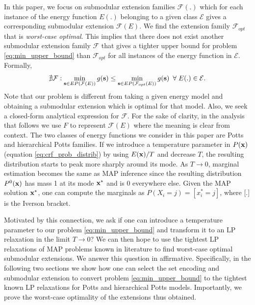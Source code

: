 In this paper, we focus on submodular extension families $\mathcal F(.)$ which
for each instance of the energy function $E(.)$ belonging to a given class $\mathcal E$ gives a corresponding
submodular extension ${\mathcal F}(E)$. We find the extension family ${\mathcal
F}_{opt}$ that is \emph{worst-case optimal}. This implies that there does not
exist another submodular extension family ${\mathcal F}$ that gives a tighter
upper bound for problem \eqref{eq:min_upper_bound} than ${\mathcal F}_{opt}$
for all instances of the energy function in $\mathcal E$. Formally, 
\begin{equation}
    \nexists {\mathcal F}: \min_{{\bf s} \in EP({\mathcal F}(E))} g({\bf s})
    \leq \min_{{\bf s} \in EP({\mathcal F}_{opt}(E))} g({\bf s}) \enspace
    \forall \; E(.) \in \mathcal E.
    \label{eq:best_submod}
\end{equation}
Note that our problem is different from taking a given energy model and
obtaining a submodular extension which is optimal for that model. Also, we seek
a closed-form analytical expression for $\mathcal F$. For the sake of clarity,
in the analysis that follows we use $F$ to represent ${\mathcal F}(E)$ where
the meaning is clear from context. The two classes of energy functions we
consider in this paper are Potts and hierarchical Potts families.
%
 If we introduce a temperature parameter in $P({\bf x})$ (equation \eqref{eq:crf_prob_distrib}) by using $E({\bf x})/T$ and decrease $T$, the resulting distribution starts to peak more sharply around its mode. As $T \to 0$, marginal estimation becomes the same as MAP inference since the resulting distribution $P^0({\bf x})$ has mass 1 at its mode ${\bf x}^*$ and is 0 everywhere else. Given the MAP solution ${\bf x}^*$, one can compute the marginals as $P(X_i = j) = [x_i^* = j]$, where [.] is the Iverson bracket.

Motivated by this connection, we ask if one can introduce a temperature parameter to our problem \eqref{eq:min_upper_bound} and transform it to an LP relaxation in the limit $T \to 0$? We can then hope to use the tightest LP relaxations of MAP problems known in literature to find worst-case optimal submodular extensions. We answer this question in affirmative. Specifically, in the following two sections we show how one can select the set encoding and submodular extension to convert problem \eqref{eq:min_upper_bound} to the tightest known LP relaxations for Potts and hierarchical Potts models. Importantly, we prove the worst-case optimality of the extensions thus obtained. 

